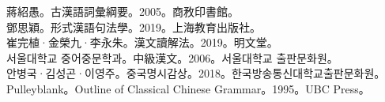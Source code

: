 蔣紹愚。古漢語詞彙綱要。2005。商敄印書館。\\
鄧思穎。形式漢語句法學。2019。上海教育出版社。\\
崔完植·金榮九·李永朱。漢文讀解法。2019。明文堂。\\
서울대학교 중어중문학과。中級漢文。2006。서울대학교 출판문화원。\\
안병국·김성곤·이영주。중국명시감상。2018。한국방송통신대학교출판문화원。\\
Pulleyblank。Outline of Classical Chinese Grammar。1995。UBC Press。\\
